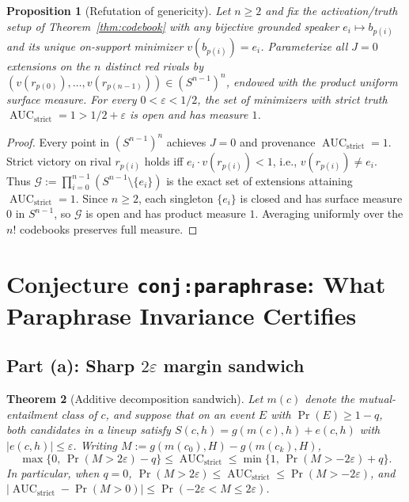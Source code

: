 \documentclass[11pt]{article}
\theoremstyle{plain}
\newtheorem{theorem}{Theorem}
\newtheorem{proposition}[theorem]{Proposition}
\theoremstyle{definition}
\theoremstyle{remark}
\DeclareMathOperator{\AUC}{AUC}
\begin{document}
\begin{proposition}[Refutation of genericity]\label{prop:genericity}
Let $n \ge 2$ and fix the activation/truth setup of Theorem~\ref{thm:codebook} with any bijective grounded speaker $e_i \mapsto b_{p(i)}$ and its unique on-support minimizer $v(b_{p(i)}) = e_i$. Parameterize all $J = 0$ extensions on the $n$ distinct red rivals by $(v(r_{p(0)}), \dots, v(r_{p(n-1)})) \in (S^{n-1})^n$, endowed with the product uniform surface measure. For every $0 < \varepsilon < 1/2$, the set of minimizers with strict truth $\AUC_{\mathrm{strict}} = 1 > 1/2 + \varepsilon$ is open and has measure $1$.
\end{proposition}

\begin{proof}
Every point in $(S^{n-1})^n$ achieves $J = 0$ and provenance $\AUC_{\mathrm{strict}} = 1$. Strict victory on rival $r_{p(i)}$ holds iff $e_i \cdot v(r_{p(i)}) < 1$, i.e., $v(r_{p(i)}) \neq e_i$. Thus $\mathcal{G} := \prod_{i=0}^{n-1} (S^{n-1} \setminus \{e_i\})$ is the exact set of extensions attaining $\AUC_{\mathrm{strict}} = 1$. Since $n \ge 2$, each singleton $\{e_i\}$ is closed and has surface measure $0$ in $S^{n-1}$, so $\mathcal{G}$ is open and has product measure $1$. Averaging uniformly over the $n!$ codebooks preserves full measure.
\end{proof}

\section{Conjecture \texttt{conj:paraphrase}: What Paraphrase Invariance Certifies}

\subsection{Part (a): Sharp \texorpdfstring{$2\varepsilon$}{2 epsilon} margin sandwich}

\begin{theorem}[Additive decomposition sandwich]\label{thm:sandwich}
Let $m(c)$ denote the mutual-entailment class of $c$, and suppose that on an event $E$ with $\Pr(E) \ge 1 - q$, both candidates in a lineup satisfy $S(c, h) = g(m(c), h) + e(c, h)$ with $|e(c, h)| \le \varepsilon$. Writing $M := g(m(c_0), H) - g(m(c_k), H)$,
\[
\max\bigl\{0,\, \Pr(M > 2\varepsilon) - q\bigr\}
\le \AUC_{\mathrm{strict}}
\le \min\bigl\{1,\, \Pr(M > -2\varepsilon) + q\bigr\}.
\]
In particular, when $q = 0$, $\Pr(M > 2\varepsilon) \le \AUC_{\mathrm{strict}} \le \Pr(M > -2\varepsilon)$, and $|\AUC_{\mathrm{strict}} - \Pr(M > 0)| \le \Pr(-2\varepsilon < M \le 2\varepsilon)$.
\end{theorem}
\end{document}
